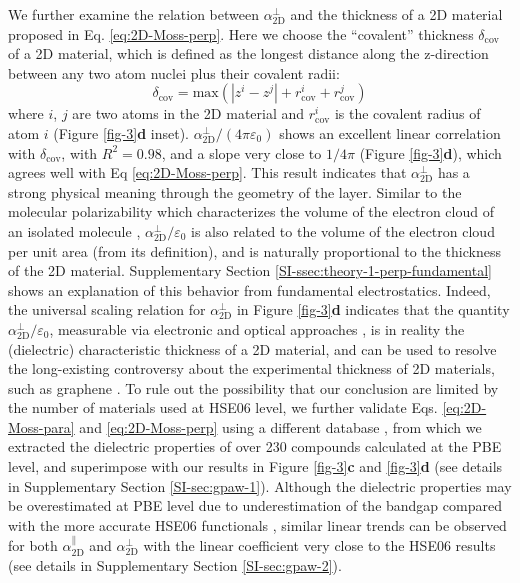 \documentclass[journal=ancac3,manuscript=article,email=true,hyperref=true,keywords=false]{achemso}
\begin{document}
We further examine the relation between $\alpha_{\mathrm{2D}}^{\perp}$ and the
thickness of a 2D material proposed in
Eq. \ref{eq:2D-Moss-perp}. Here we choose the ``covalent'' thickness
$\delta_{\mathrm{cov}}$ of a 2D material, which is defined as the
longest distance along the z-direction between any two atom nuclei
plus their covalent radii:
%
%
\begin{equation}
  \label{eq:cov-thick}
  \delta_{\mathrm{cov}} = \mathrm{max}(|z^{i} - z^{j}|
  + r^{i}_{\mathrm{cov}} + r^{j}_{\mathrm{cov}})
\end{equation}
where $i$, $j$ are two atoms in the 2D material and $r_{\mathrm{cov}}^{i}$
is the covalent radius of atom $i$ (Figure \ref{fig-3}{\textbf d} inset). 
%
%
$\alpha_{\mathrm{2D}}^{\perp}/(4 \pi \varepsilon_{0})$ shows an
excellent linear correlation with $\delta_{\mathrm{cov}}$, with
$R^{2}=0.98$, and a slope very close to $1/4\pi$ (Figure
\ref{fig-3}{\textbf d}), which agrees well with Eq
\ref{eq:2D-Moss-perp}.  This result indicates that
$\alpha_{\mathrm{2D}}^{\perp}$ has a strong physical meaning through
the geometry of the layer.  Similar to the molecular polarizability
which characterizes the volume of the electron cloud of an isolated
molecule \cite{Israelachvili_2011},
$\alpha_{\mathrm{2D}}^{\perp}/\varepsilon_{0}$ is also related to the
volume of the electron cloud per unit area (from its definition), and
is naturally proportional to the thickness of the 2D
material. Supplementary Section
\ref{SI-ssec:theory-1-perp-fundamental} shows an explanation of this
behavior from fundamental electrostatics. Indeed, the universal
scaling relation for $\alpha_{\mathrm{2D}}^{\perp}$ in Figure
\ref{fig-3}{\textbf d} indicates that the quantity
$\alpha_{\mathrm{2D}}^{\perp}/\varepsilon_{0}$, measurable via
electronic and optical approaches
\cite{Antoine_1999,Cherniavskaya_2003,Krauss_1999_EFM,Pedersen_2016,Klein_2016,Roch_2018},
is in reality the (dielectric) characteristic thickness of a 2D
material, and can be used to resolve the long-existing controversy
about the experimental thickness of 2D materials, such as graphene
\cite{Shearer_2016}.
%
To rule out the possibility that our conclusion are limited by the
number of materials used at HSE06 level, we further validate
Eqs. \ref{eq:2D-Moss-para} and \ref{eq:2D-Moss-perp} using a different
database \cite{Haastrup_2018}, from which we extracted the dielectric
properties of over 230 compounds calculated at the PBE level, and
superimpose with our results in Figure \ref{fig-3}{\textbf c} and
\ref{fig-3}{\textbf d} (see details in Supplementary Section
\ref{SI-sec:gpaw-1}). Although the dielectric properties may be
overestimated at PBE level due to underestimation of the bandgap
compared with the more accurate HSE06 functionals
\cite{Van_Dyck_2017}, similar linear trends can be observed for both
$\alpha^{\parallel}_{\mathrm{2D}}$ and $\alpha_{\mathrm{2D}}^{\perp}$
with the linear coefficient very close to the HSE06 results (see
details in Supplementary Section \ref{SI-sec:gpaw-2}).
\end{document}
